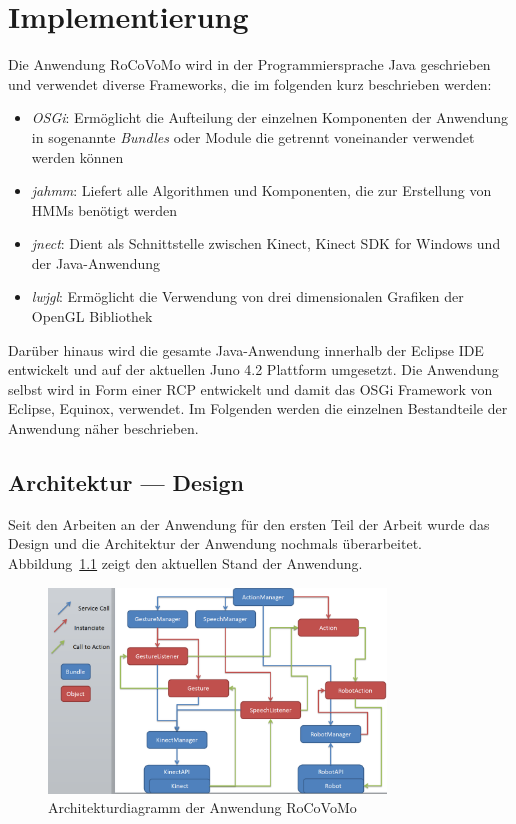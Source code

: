 \chapter{Implementierung}
\label{chap:Implementierung}

Die Anwendung RoCoVoMo wird in der Programmiersprache Java geschrieben und verwendet diverse Frameworks, die im folgenden kurz beschrieben werden:

\begin{itemize}
\item \textit{\gls{OSGi}}: Erm\"oglicht die Aufteilung der einzelnen Komponenten der Anwendung in sogenannte \textit{Bundles} oder Module die getrennt voneinander verwendet werden k\"onnen
\item \textit{jahmm}: Liefert alle Algorithmen und Komponenten, die zur Erstellung von \glspl{HMM} ben\"otigt werden
\item \textit{jnect}: Dient als Schnittstelle zwischen Kinect, Kinect SDK for Windows und der Java-Anwendung
\item \textit{lwjgl}: Erm\"oglicht die Verwendung von drei dimensionalen Grafiken der OpenGL Bibliothek
\end{itemize}

Dar\"uber hinaus wird die gesamte Java-Anwendung innerhalb der \gls{Eclipse} \gls{IDE} entwickelt und auf der aktuellen Juno 4.2 Plattform umgesetzt. Die Anwendung selbst wird in Form einer \gls{RCP} entwickelt und damit das \gls{OSGi} Framework von Eclipse, \gls{Equinox}, verwendet.
\newline
Im Folgenden werden die einzelnen Bestandteile der Anwendung n\"aher beschrieben.

\section{Architektur --- Design}
Seit den Arbeiten an der Anwendung f\"ur den ersten Teil der Arbeit wurde das Design und die Architektur der Anwendung nochmals \"uberarbeitet. Abbildung~\ref{fig:architecture} zeigt den aktuellen Stand der Anwendung.

\begin{figure}[htb]
\centering
\includegraphics[width=0.8\textwidth]{img/impl/architecture.png}
\caption[Architekturdiagramm der Anwendung RoCoVoMo]{Architekturdiagramm der Anwendung RoCoVoMo}
\label{fig:architecture}
\end{figure}

